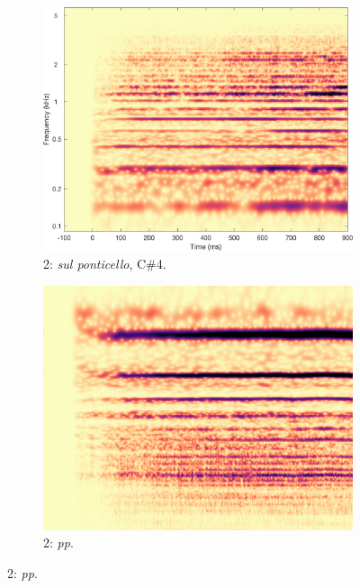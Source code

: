 \begin{figure}
        \begin{subfigure}{0.20\textwidth}
                \centering
                \includegraphics[width=\linewidth]{./figs/demo/Vn-pont-Csh4-mf-4c.png}
                \caption*{2: \emph{sul ponticello}, C\#4.}
                \label{fig:Vn-pont-Csh4-mf-4c}
        \end{subfigure}%
        \begin{subfigure}{0.20\textwidth}
                \centering
                \includegraphics[width=\linewidth]{./figs/demo/Vn-ord-G4-pp-4c.png}
                \caption*{2: \emph{pp}.}
                \label{fig:Vn-ord-G4-pp-4c}
        \end{subfigure}%


\end{figure}
